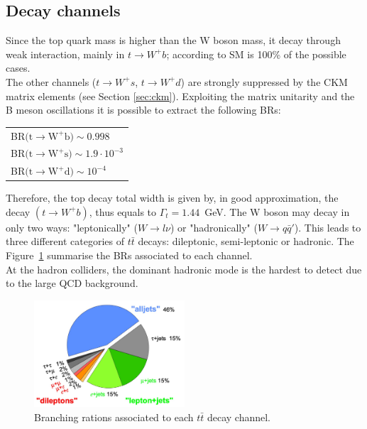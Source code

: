 \subsection{Decay channels}
Since the top quark mass is higher than the W boson mass, it decay through weak interaction, mainly in $t\rightarrow W^{+}b$; according to SM is 100\% of the possible cases.\\
The other channels ($t\rightarrow W^{+}s$, $t\rightarrow W^{+}d$) are strongly suppressed by the CKM matrix elements (see Section \ref{sec:ckm}). Exploiting the matrix unitarity 
and the B meson oscillations it is possible to extract the following BRs\cite{tdecayBR}:
\begin{table}[!ht]
	\centering
	\begin{tabular}{l}
		BR$(\mathrm{t \rightarrow W^{+} b)\sim 0.998}$\\
		BR$(\mathrm{t \rightarrow W^{+} s)\sim 1.9\cdot10^{-3}}$\\
		BR$(\mathrm{t \rightarrow W^{+} d)\sim 10^{-4}}$\\
	\end{tabular}
\end{table}
\newline Therefore, the top decay total width is given by, in good approximation, the decay $(t \rightarrow W^{+} b)$, thus equals to $\Gamma_t = 1.44$~GeV.
The W boson may decay in only two ways: "leptonically" ($W\rightarrow l\nu$) or "hadronically" ($W\rightarrow q\bar{q}'$). This leads to three different categories
of $t\bar{t}$ decays: dileptonic, semi-leptonic or hadronic. The Figure~\ref{fig:ttBR} summarise the BRs associated to each channel.\\
At the hadron colliders, the dominant hadronic mode is the hardest to detect due to the large QCD background.
\begin{figure}[!h]
	\centering
	\includegraphics[width=0.5\textwidth]{Chapters/CH1/figures/ttBR}
	\caption{Branching rations associated to each $t\bar{t}$ decay channel\cite{ttdecayBR}.}
	\label{fig:ttBR}
\end{figure}

